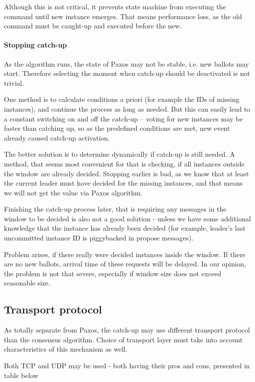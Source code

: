 Although this is not critical, it prevents state machine from executing the command until new instance emerges. That means performance loss, as the old command must be caught-up and executed before the new.

\paragraph*{Stopping catch-up} As the algorithm runs, the state of Paxos may not be stable, i.e. new ballots may start. Therefore selecting the moment when catch-up should be deactivated is not trivial.

One method is to calculate conditions a priori (for example the IDs of missing instances), and continue the process as long as needed. But this can easily lead to a constant switching on and off the catch-up -- voting for new instances may be faster than catching up, so as the predefined conditions are met, new event already caused catch-up activation.

The better solution is to determine dynamically if catch-up is still needed. A method, that seems most convenient for that is checking, if all instances outside the window are already decided. Stopping earlier is bad, as we know that at least the current leader must have decided for the missing instances, and that means we will not get the value via Paxos algorithm.

Finishing the catch-up process later, that is requiring any messages in the window to be decided is also not a good solution - unless we have some additional knowledge that the instance has already been decided (for example, leader's last uncommitted instance ID is piggybacked in propose messages).

Problem arises, if there really were decided instances inside the window. If there are no new ballots, arrival time of these requests will be delayed. In our opinion, the problem is not that severe, especially if window size does not exceed reasonable size.

\subsection{Transport protocol}
\label{subsec:Transport_protocole}
As totally separate from Paxos, the catch-up may use different transport protocol than the consensus algorithm.
Choice of transport layer must take into account characteristics of this mechanism as well.

Both TCP and UDP may be used - both having their pros and cons, presented in table below

